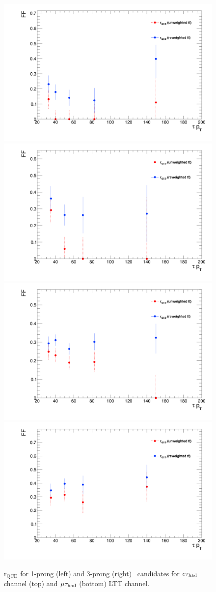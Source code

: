 \begin{figure}[htbp]
\centering
\includegraphics[width=.4\textwidth]{DiHiggs/plots/FF_CRs/LTTElecrQCD1p.png}
\includegraphics[width=.4\textwidth]{DiHiggs/plots/FF_CRs/LTTElecrQCD3p.png} \\
\includegraphics[width=.4\textwidth]{DiHiggs/plots/FF_CRs/LTTMuonrQCD1p.png}
\includegraphics[width=.4\textwidth]{DiHiggs/plots/FF_CRs/LTTMuonrQCD3p.png}\\
\caption{$\mathrm{r}_{\mathrm{QCD}}$ for 1-prong (left) and 3-prong (right) \tauhad\ candidates for $e\tau_{\mathrm{had}}$ channel (top) and $\mu\tau_{\mathrm{had}}$ (bottom)
LTT channel.}
\label{fig:LTT_rQCD}
\end{figure}

